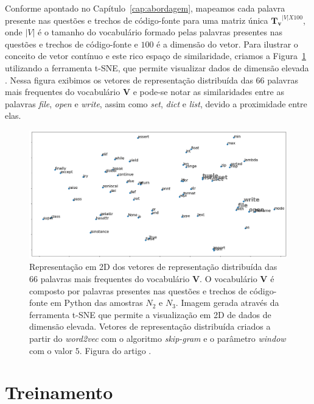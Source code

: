 Conforme apontado no Capítulo~\ref{cap:abordagem}, mapeamos cada palavra presente nas questões e trechos de código-fonte para uma matriz única $\bm{T_{v}}^{|V| X 100}$, onde $|V|$ é o tamanho do vocabulário formado pelas palavras presentes nas questões e trechos de código-fonte e $100$ é a dimensão do vetor. Para ilustrar o conceito de vetor contínuo e este rico espaço de similaridade, criamos a Figura~\ref{fig:tsne-code-snippet-python} utilizando a ferramenta t-SNE, que permite visualizar dados de dimensão elevada \citep{scikit-learn-tsne-2019, quora-tsne-2019}. Nessa figura exibimos os vetores de representação distribuída das 66 palavras mais frequentes do vocabulário $\bm{V}$ e pode-se notar as similaridades entre as palavras \emph{file}, \emph{open}  e \emph{write}, assim como \emph{set}, \emph{dict} e \emph{list}, devido a proximidade entre elas.

\begin{figure}[H]
\includegraphics[width=1\textwidth]{figuras/cap-experimento/code_tsne.png}
\caption[Representação em 2D dos vetores de representação distribuída das 66 palavras mais frequentes do vocabulário $\bm{V}$.]{Representação em 2D dos vetores de representação distribuída das 66 palavras mais frequentes do vocabulário $\bm{V}$. O vocabulário $\bm{V}$ é composto por palavras presentes nas questões e trechos de código-fonte em Python das amostras $N_{2}$ e $N_{3}$. Imagem gerada através da ferramenta t-SNE que permite a visualização em 2D de dados de dimensão elevada. Vetores de representação distribuída criados a partir do \textit{word2vec} com o algoritmo \textit{skip-gram} e o parâmetro \textit{window} com o valor $5$. Figura do artigo \cite{martins2020concra}.}
\label{fig:tsne-code-snippet-python}
\end{figure}

\section{Treinamento}
\label{sec:treinamento}

